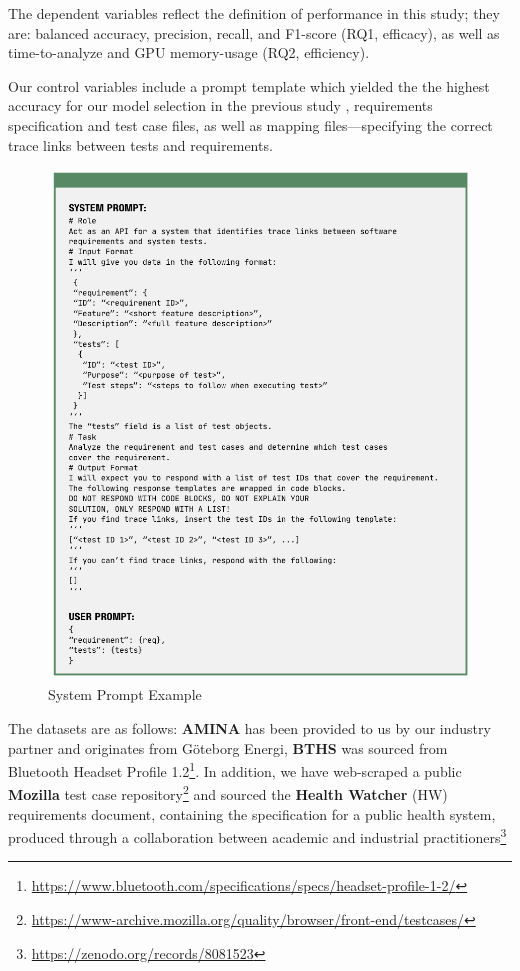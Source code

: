 \documentclass[conference]{IEEEtran}
\begin{document}
The dependent variables reflect the definition of performance in this study; they are: balanced accuracy, precision, recall, and F1-score (RQ1, efficacy), as well as time-to-analyze and GPU memory-usage (RQ2, efficiency).

Our control variables include a prompt template which yielded the the highest accuracy for our model selection in the previous study \cite{quinstedt2024Optimizing}, requirements specification and test case files, as well as mapping files---specifying the correct trace links between tests and requirements. 

\begin{figure}
    \centering
    \includegraphics[width=\linewidth]{images/system_prompt}
    \caption{System Prompt Example}
    \label{fig:system_prompt}
\end{figure}

The datasets are as follows: \textbf{AMINA} has been provided to us by our industry partner and originates from G\"oteborg Energi, \textbf{BTHS} was sourced from Bluetooth Headset Profile 1.2\footnote{\url{https://www.bluetooth.com/specifications/specs/headset-profile-1-2/}}. In addition, we have web-scraped a public \textbf{Mozilla} test case repository\footnote{\url{https://www-archive.mozilla.org/quality/browser/front-end/testcases/}} and sourced the \textbf{Health Watcher} (HW) requirements document, containing the specification for a public health system, produced through a collaboration between academic and industrial practitioners\footnote{\url{https://zenodo.org/records/8081523}}
\end{document}
